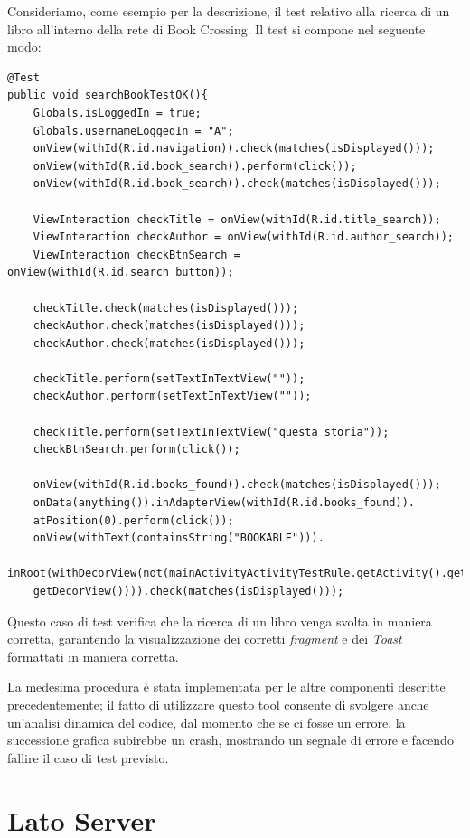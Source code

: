 Consideriamo, come esempio per la descrizione, il test relativo alla ricerca di un libro all'interno della rete di Book Crossing. Il test si compone nel seguente modo:
\begin{lstlisting}
@Test
public void searchBookTestOK(){
	Globals.isLoggedIn = true;
	Globals.usernameLoggedIn = "A";
	onView(withId(R.id.navigation)).check(matches(isDisplayed()));
	onView(withId(R.id.book_search)).perform(click());
	onView(withId(R.id.book_search)).check(matches(isDisplayed()));
	
	ViewInteraction checkTitle = onView(withId(R.id.title_search));
	ViewInteraction checkAuthor = onView(withId(R.id.author_search));
	ViewInteraction checkBtnSearch = onView(withId(R.id.search_button));
	
	checkTitle.check(matches(isDisplayed()));
	checkAuthor.check(matches(isDisplayed()));
	checkAuthor.check(matches(isDisplayed()));
	
	checkTitle.perform(setTextInTextView(""));
	checkAuthor.perform(setTextInTextView(""));
	
	checkTitle.perform(setTextInTextView("questa storia"));
	checkBtnSearch.perform(click());
	
	onView(withId(R.id.books_found)).check(matches(isDisplayed()));
	onData(anything()).inAdapterView(withId(R.id.books_found)).
	atPosition(0).perform(click());
	onView(withText(containsString("BOOKABLE"))).
	inRoot(withDecorView(not(mainActivityActivityTestRule.getActivity().getWindow().
	getDecorView()))).check(matches(isDisplayed()));
\end{lstlisting}

Questo caso di test verifica che la ricerca di un libro venga svolta in maniera corretta, garantendo la visualizzazione dei corretti \textit{fragment} e dei \textit{Toast} formattati in maniera corretta.

La medesima procedura è stata implementata per le altre componenti descritte precedentemente; il fatto di utilizzare questo tool consente di svolgere anche un'analisi dinamica del codice, dal momento che se ci fosse un errore, la successione grafica subirebbe un crash, mostrando un segnale di errore e facendo fallire il caso di test previsto.

\section{Lato Server}
